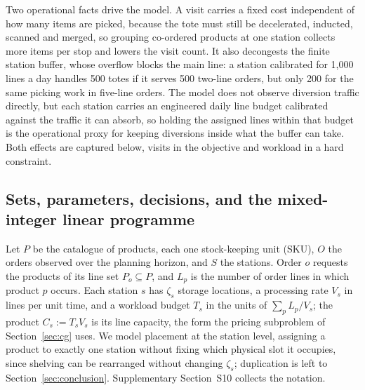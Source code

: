 \documentclass[]{interact}
\begin{document}
Two operational facts drive the model. A visit carries a fixed cost independent of how many items are picked, because the tote must still be decelerated, inducted, scanned and merged, so grouping co-ordered products at one station collects more items per stop and lowers the visit count. It also decongests the finite station buffer, whose overflow blocks the main line: a station calibrated for 1,000 lines a day handles 500 totes if it serves 500 two-line orders, but only 200 for the same picking work in five-line orders. The model does not observe diversion traffic directly, but each station carries an engineered daily line budget calibrated against the traffic it can absorb, so holding the assigned lines within that budget is the operational proxy for keeping diversions inside what the buffer can take. Both effects are captured below, visits in the objective and workload in a hard constraint.

\subsection{Sets, parameters, decisions, and the mixed-integer linear programme}
Let $P$ be the catalogue of products, each one stock-keeping unit (SKU), $O$ the orders observed over the planning horizon, and $S$ the stations. Order $o$ requests the products of its line set $P_o \subseteq P$, and $L_p$ is the number of order lines in which product $p$ occurs. Each station $s$ has $\zeta_s$ storage locations, a processing rate $V_s$ in lines per unit time, and a workload budget $T_s$ in the units of $\sum_{p} L_p/V_s$; the product $C_s := T_s V_s$ is its line capacity, the form the pricing subproblem of Section~\ref{sec:cg} uses. We model placement at the station level, assigning a product to exactly one station without fixing which physical slot it occupies, since shelving can be rearranged without changing $\zeta_s$; duplication is left to Section~\ref{sec:conclusion}. Supplementary Section~S10 collects the notation.
\end{document}
